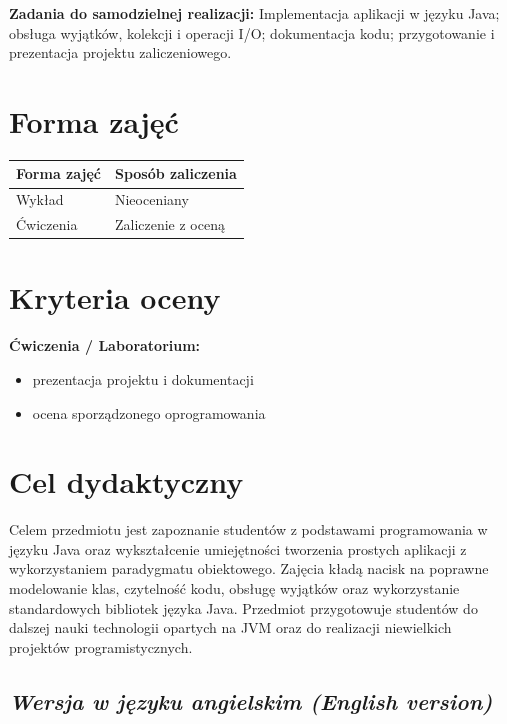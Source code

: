 \documentclass[12pt, a4paper]{article}
\newcommand{\thdrule}{\noalign{\global\setlength{\extrarowheight}{0pt}}}
\newcommand{\thdend}{\noalign{\global\setlength{\extrarowheight}{3pt}}}
\begin{document}
\vspace{4pt}
\noindent\textbf{Zadania do samodzielnej realizacji:} Implementacja aplikacji w języku Java; obsługa wyjątków, kolekcji i operacji I/O; dokumentacja kodu; przygotowanie i prezentacja projektu zaliczeniowego.

\section{Forma zajęć}

\begin{center}
{\scriptsize
\begin{tabular}{m{5cm}m{8cm}}
\thdrule\toprule
\rowcolor{pjatkRed} {\color{white}\textbf{Forma zajęć}} & {\color{white}\textbf{Sposób zaliczenia}} \\
\midrule\thdend
  \rowcolor{tableRowLight} Wykład & Nieoceniany \\
  \rowcolor{tableRowAlt} Ćwiczenia & Zaliczenie z oceną \\
\bottomrule
\end{tabular}}
\end{center}

\section{Kryteria oceny}

\textbf{Ćwiczenia / Laboratorium:}
\begin{itemize}
  \item prezentacja projektu i dokumentacji
  \item ocena sporządzonego oprogramowania
\end{itemize}


\section{Cel dydaktyczny}

Celem przedmiotu jest zapoznanie studentów z podstawami programowania w języku Java oraz wykształcenie umiejętności tworzenia prostych aplikacji z wykorzystaniem paradygmatu obiektowego. Zajęcia kładą nacisk na poprawne modelowanie klas, czytelność kodu, obsługę wyjątków oraz wykorzystanie standardowych bibliotek języka Java. Przedmiot przygotowuje studentów do dalszej nauki technologii opartych na JVM oraz do realizacji niewielkich projektów programistycznych.

\subsection*{\textit{Wersja w języku angielskim (English version)}}
\end{document}
